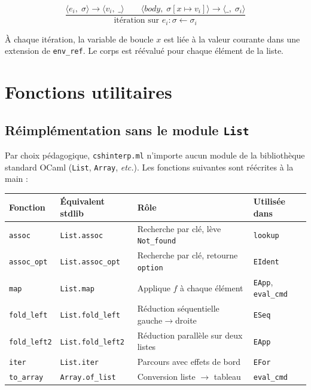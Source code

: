 \documentclass[11pt,a4paper]{article}
\newcommand{\sem}[4]{%
  \langle #1,\;#2\rangle \rightarrow \langle #3,\;#4\rangle}
\newcommand{\ext}[3]{#1\!\left[#2 \mapsto #3\right]}
\newcommand{\irule}[2]{%
  \dfrac{\displaystyle #1}{\displaystyle #2}
}
\begin{document}
\[
\irule{
\sem{e_i}{\sigma}{v_i}{\_}
\qquad
\sem{body}{\ext{\sigma}{x}{v_i}}{\_}{\sigma_i}
}{
\text{itération sur } e_i : \sigma \leftarrow \sigma_i
}
\]

À chaque itération, la variable de boucle $x$ est liée à la valeur
courante dans une extension de \texttt{env\_ref}.
Le corps est réévalué pour chaque élément de la liste.

\section{Fonctions utilitaires}

\subsection{Réimplémentation sans le module \texttt{List}}

Par choix pédagogique, \texttt{cshinterp.ml} n'importe aucun module
de la bibliothèque standard OCaml (\texttt{List}, \texttt{Array},
\textit{etc.}). Les fonctions suivantes sont réécrites à la main :

\begin{center}
\begin{longtable}{|l|l|p{4.5cm}|l|}
\hline
\textbf{Fonction} & \textbf{Équivalent stdlib} & \textbf{Rôle} & \textbf{Utilisée dans} \\
\hline
\texttt{assoc} & \texttt{List.assoc} & Recherche par clé, lève \texttt{Not\_found} & \texttt{lookup} \\
\hline
\texttt{assoc\_opt} & \texttt{List.assoc\_opt} & Recherche par clé, retourne \texttt{option} & \texttt{EIdent} \\
\hline
\texttt{map} & \texttt{List.map} & Applique $f$ à chaque élément & \texttt{EApp}, \texttt{eval\_cmd} \\
\hline
\texttt{fold\_left} & \texttt{List.fold\_left} & Réduction séquentielle gauche$\to$droite & \texttt{ESeq} \\
\hline
\texttt{fold\_left2} & \texttt{List.fold\_left2} & Réduction parallèle sur deux listes & \texttt{EApp} \\
\hline
\texttt{iter} & \texttt{List.iter} & Parcours avec effets de bord & \texttt{EFor} \\
\hline
\texttt{to\_array} & \texttt{Array.of\_list} & Conversion liste $\to$ tableau & \texttt{eval\_cmd} \\
\hline
\end{longtable}
\end{center}
\end{document}
